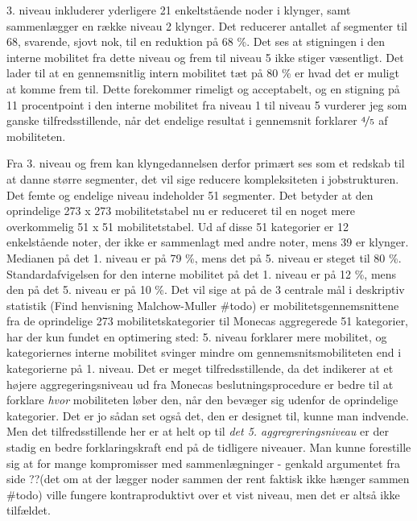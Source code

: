 3. niveau inkluderer yderligere 21 enkeltstående noder i klynger, samt sammenlægger en række niveau 2 klynger. Det reducerer antallet af segmenter til 68, svarende, sjovt nok, til en reduktion på 68 \%. Det ses at stigningen i den interne mobilitet fra dette niveau og frem til niveau 5 ikke stiger væsentligt. Det lader til at en gennemsnitlig intern mobilitet tæt på 80 \% er hvad det er muligt at komme frem til. Dette forekommer rimeligt og acceptabelt, og en stigning på 11 procentpoint i den interne mobilitet fra niveau 1 til niveau 5 vurderer jeg som ganske tilfredsstillende, når det endelige resultat i gennemsnit forklarer $\nicefrac{4}{5}$ af mobiliteten. 

Fra 3. niveau og frem kan klyngedannelsen derfor primært ses som et redskab til at danne større segmenter, det vil sige reducere kompleksiteten i jobstrukturen. Det femte og endelige niveau indeholder 51 segmenter. Det betyder at den oprindelige 273 x 273 mobilitetstabel nu er reduceret til en noget mere overkommelig 51 x 51 mobilitetstabel. Ud af disse 51 kategorier er 12 enkelstående noter, der ikke er sammenlagt med andre noter, mens 39 er klynger. Medianen på det 1. niveau er på 79 \%, mens det på 5. niveau er steget til 80 \%. Standardafvigelsen for den interne mobilitet på det 1. niveau er på 12 \%, mens den på det 5. niveau er på 10 \%. Det vil sige at på de 3 centrale mål i deskriptiv statistik (Find henvisning Malchow-Muller \#todo) er mobilitetsgennemsnittene fra de oprindelige 273 mobilitetskategorier til Monecas aggregerede 51 kategorier, har der kun fundet en optimering sted: 5. niveau forklarer mere mobilitet, og kategoriernes interne mobilitet svinger mindre om gennemsnitsmobiliteten end i kategorierne på 1. niveau. Det er meget tilfredsstillende, da det indikerer at et højere aggregeringsniveau ud fra Monecas beslutningsprocedure er bedre til at forklare \emph{hvor} mobiliteten løber den, når den bevæger sig udenfor de oprindelige kategorier. Det er jo sådan set også det, den er designet til, kunne man indvende. Men det tilfredsstillende her er at helt op til \emph{det 5. aggregreringsniveau} er der stadig en bedre forklaringskraft end på de tidligere niveauer. Man kunne forestille sig at for mange kompromisser med sammenlægninger - genkald argumentet fra side ??(det om at der lægger noder sammen der rent faktisk ikke hænger sammen \#todo) ville fungere kontraproduktivt over et vist niveau, men det er altså ikke tilfældet. %

